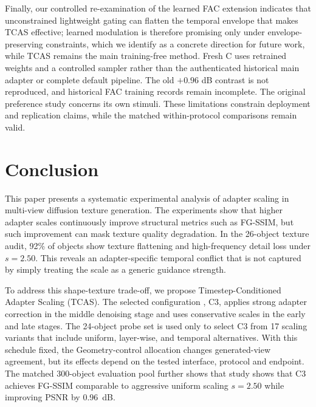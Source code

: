 \documentclass[times,twocolumn,final]{elsarticle}
\providecommand{\DIFadd}[1]{{\protect\color{blue} \sf #1}} %
\providecommand{\DIFdel}[1]{{\protect\color{red} \scriptsize #1}} %
\providecommand{\DIFaddbegin}{} %
\providecommand{\DIFaddend}{} %
\providecommand{\DIFdelbegin}{} %
\providecommand{\DIFdelend}{} %
\begin{document}
\DIFdelbegin \DIFdel{Finally, our controlled re-examination of the learned FAC extension indicates that unconstrained lightweight gating can flatten the temporal envelope that makes TCAS effective; learned modulation is therefore promising only under envelope-preserving constraints, which we identify as a concrete direction for future work, while TCAS remains the main training-free method.
}\DIFdelend \DIFaddbegin \DIFadd{Fresh C uses retrained weights and a controlled sampler rather than the authenticated historical main adapter or complete default pipeline. The old $+0.96$ dB contrast is not reproduced, and historical FAC training records remain incomplete. The original preference study concerns its own stimuli. These limitations constrain deployment and replication claims, while the matched within-protocol comparisons remain valid.
}\DIFaddend 

\section{Conclusion}
\label{sec:conclusion}

\DIFdelbegin \DIFdel{This paper presents a systematic experimental analysis of adapter scaling in multi-view diffusion texture generation. The experiments show that higher adapter scales continuously improve structural metrics such as FG-SSIM, but such improvement can mask texture quality degradation. In the 26-object texture audit, 92\% of objects show texture flattening and high-frequency detail loss under $s = 2.50$. This reveals an adapter-specific temporal conflict that is not captured by simply treating the scale as a generic guidance strength.
}%

\DIFdel{To address this shape-texture trade-off, we propose Timestep-Conditioned Adapter Scaling (TCAS). The selected configuration , C3, applies strong adapter correction in the middle denoising stage and uses conservative scales in the early and late stages. The 24-object probe set is used only to select C3 from 17 scaling variants that include uniform, layer-wise, and temporal alternatives. With this schedule fixed, the }\DIFdelend \DIFaddbegin \DIFadd{Geometry-control allocation changes generated-view agreement, but its effects depend on the tested interface, protocol and endpoint. The matched }\DIFaddend 300-object \DIFdelbegin \DIFdel{evaluation pool further shows that }\DIFdelend \DIFaddbegin \DIFadd{study shows that }\DIFaddend C3\DIFdelbegin \DIFdel{achieves FG-SSIM comparable to aggressive uniform scaling $s = 2.50$ while improving PSNR by 0.96~dB.
}%
\end{document}
